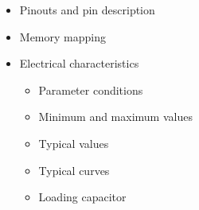 \documentclass{article}
\begin{document}
\begin{itemize}
\begin{itemize}
        \item VBAT operation 
        \item Timers and watchdogs 
        \item Advanced-control timers (TIM1) 
        \item General-purpose timers (TIMx) 
        \item Independent watchdog 
        \item Window watchdog 
        \item SysTick timer 
        \item Inter-integrated circuit interface (I2C) 
        \item Universal synchronous/asynchronous receiver transmitters (USART) 
        \item Serial peripheral interface (SPI) 
        \item Inter-integrated sound (I2S) 
        \item Audio PLL (PLLI2S) 
        \item Secure digital input/output interface (SDIO) 
        \item Universal serial bus on-the-go full-speed (OTG\_FS) 
        \item General-purpose input/outputs (GPIOs) 
        \item Analog-to-digital converter (ADC) 
        \item Temperature sensor 
        \item Serial wire JTAG debug port (SWJ-DP) 
        \item Embedded Trace Macrocell™ 
    \end{itemize}
    \item Pinouts and pin description 
    \item Memory mapping 
    \item Electrical characteristics 
    \begin{itemize}
        \item Parameter conditions 
        \item Minimum and maximum values 
        \item Typical values 
        \item Typical curves 
        \item Loading capacitor 

\end{itemize}
\end{itemize}
\end{document}
